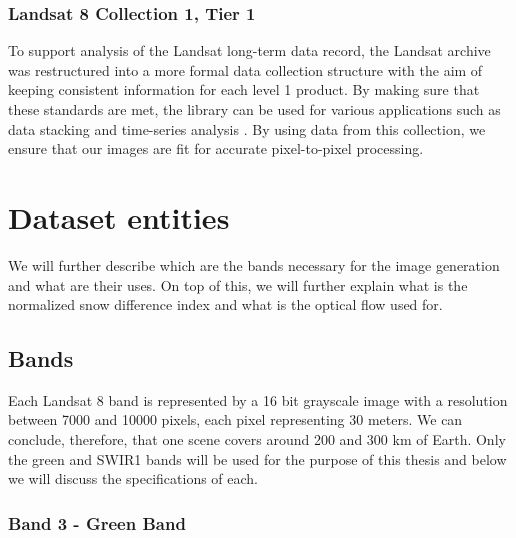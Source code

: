 \documentclass[12pt, a4paper]{report}
\begin{document}
	\subsubsection{Landsat 8 Collection 1, Tier 1}
	
	\par To support analysis  of the Landsat long-term data record, the Landsat archive was restructured into a more formal data collection structure with the aim of keeping consistent information for each level 1 product. By making sure that these standards are met, the library can be used for various applications such as data stacking and time-series analysis \cite{lc1l1}. By using data from this collection, we ensure that our images are fit for accurate pixel-to-pixel processing.
	
	\section{Dataset entities}
	
	\par We will further describe which are the bands necessary for the image generation and what are their uses. On top of this, we will further explain what is the normalized snow difference index and what is the optical flow used for.
	
	\subsection{Bands}
	
	\par Each Landsat 8 band is represented by a 16 bit grayscale image with a resolution between 7000 and 10000 pixels, each pixel representing 30 meters. We can conclude, therefore, that one scene covers around 200 and 300 km of Earth. Only the green and SWIR1 bands will be used for the purpose of this thesis and below we will discuss the specifications of each. 
	
	\subsubsection{Band 3 - Green Band}
	
\end{document}

